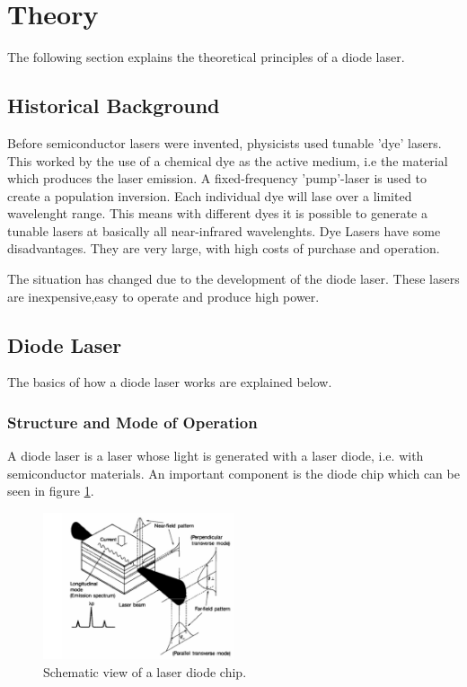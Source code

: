 \section[Theory]{Theory \textnormal{\cite{diode_laser}}}
\label{sec:theory}

The following section explains the theoretical principles of a diode laser.

\subsection{Historical Background}
\label{sec:Historical Background}

Before semiconductor lasers were invented, physicists used tunable 'dye' lasers.
This worked by the use of a chemical dye as the active medium, i.e the material which produces the laser emission.
A fixed-frequency 'pump'-laser is used to create a population inversion. Each individual dye will lase over a limited wavelenght range.
This means with different dyes it is possible to generate a tunable lasers at basically all near-infrared wavelenghts.
Dye Lasers have some disadvantages. They are very large, with high costs of purchase and operation.

The situation has changed due to the development of the diode laser. These lasers are inexpensive,easy to operate and produce high power.

\subsection{Diode Laser}
\label{sec:Diode Laser}

The basics of how a diode laser works are explained below.

\subsubsection{Structure and Mode of Operation}
\label{Structure and Mode of Operation}

A diode laser is a laser whose light is generated with a laser diode, i.e. with semiconductor materials.
An important component is the diode chip which can be seen in figure \ref{fig:diodechip}.

\begin{figure}[H]
    \centering
    \includegraphics[width=0.5\textwidth]{content/graphics/laserdiodechip.jpg}
    \caption{Schematic view of a laser diode chip.} %
    \label{fig:diodechip}
\end{figure}

